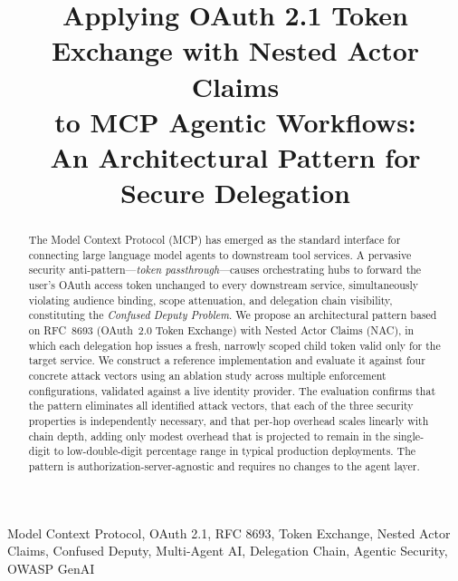 \documentclass[journal]{IEEEtran}
\begin{document}
\title{Applying OAuth 2.1 Token Exchange with Nested Actor Claims\\
to MCP Agentic Workflows:\\
An Architectural Pattern for Secure Delegation}

\author{
}

\maketitle

\begin{abstract}
The Model Context Protocol (MCP) has emerged as the standard interface for
connecting large language model agents to downstream tool services. A pervasive
security anti-pattern---\textit{token passthrough}---causes orchestrating hubs
to forward the user's OAuth access token unchanged to every downstream service,
simultaneously violating audience binding, scope attenuation, and delegation
chain visibility, constituting the \textit{Confused Deputy Problem}. We propose
an architectural pattern based on RFC~8693 (OAuth~2.0 Token Exchange) with
Nested Actor Claims (NAC), in which each delegation hop issues a fresh,
narrowly scoped child token valid only for the target service. We construct a
reference implementation and evaluate it against four concrete attack vectors
using an ablation study across multiple enforcement configurations, validated
against a live identity provider. The evaluation confirms that the pattern
eliminates all identified attack vectors, that each of the three security
properties is independently necessary, and that per-hop overhead scales
linearly with chain depth, adding only modest overhead that is projected to
remain in the single-digit to low-double-digit percentage range in typical
production deployments. The pattern is authorization-server-agnostic and
requires no changes to the agent layer.
\end{abstract}

\begin{IEEEkeywords}
Model Context Protocol, OAuth 2.1, RFC 8693, Token Exchange, Nested Actor Claims,
Confused Deputy, Multi-Agent AI, Delegation Chain, Agentic Security, OWASP GenAI
\end{IEEEkeywords}
\end{document}
